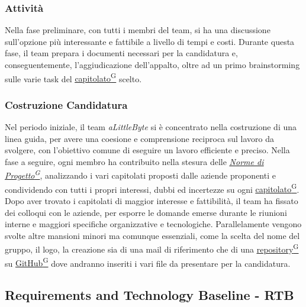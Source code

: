 \documentclass[a4paper,12pt]{article}
\providecommand{\glslink}[2]{\href{https://alittlebyte-19.github.io/Documentazione/glossario.html\#gls-#1}{\underline{#2}\textsuperscript{\scriptsize G}}}
\begin{document}
\subsubsection{Attività}
\label{sec:prertb_attivita}
Nella fase preliminare, con tutti i membri del team, si ha una discussione sull'opzione più interessante e fattibile a livello di tempi e costi.
Durante questa fase, il team prepara i documenti necessari per la candidatura e, conseguentemente, l'aggiudicazione dell'appalto, oltre ad un primo brainstorming sulle varie
task del \glslink{capitolato}{capitolato} scelto.
\subsubsection{Costruzione Candidatura}
\label{sec:costruzione_candidatura}
Nel periodo iniziale, il team \textit{aLittleByte} si è concentrato nella costruzione di una linea guida, per avere una coesione e comprensione reciproca sul lavoro da svolgere,
con l'obiettivo comune di eseguire un lavoro efficiente e preciso.
Nella fase a seguire, ogni membro ha contribuito nella stesura delle \textit{\glslink{norme-di-progetto}{Norme di Progetto}}, analizzando i vari capitolati proposti dalle aziende proponenti e condividendo
con tutti i propri interessi, dubbi ed incertezze su ogni \glslink{capitolato}{capitolato}. Dopo aver trovato i capitolati di maggior interesse e fattibilità, il team ha fissato dei colloqui con le aziende, per esporre le domande emerse durante le riunioni interne e maggiori specifiche organizzative e tecnologiche.
Parallelamente vengono svolte altre mansioni minori ma comunque essenziali, come la scelta del nome del gruppo, il logo, la creazione sia di una mail di riferimento che di una \glslink{repository}{repository} su
\glslink{github}{GitHub} dove andranno inseriti i vari file da presentare per la candidatura.

\subsection{Requirements and Technology Baseline - RTB}
\label{sec:requirements-and-technology-baseline}
\end{document}
